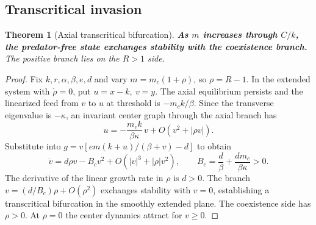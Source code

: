 \documentclass[12pt,a4paper,twoside,fleqn]{article}
\theoremstyle{journal}
\newtheorem{theorem}{Theorem}
\newcommand{\claim}[1]{{\normalfont\bfseries\boldmath #1}}
\begin{document}
\subsection{Transcritical invasion}
\begin{theorem}[Axial transcritical bifurcation]\label{thm:tc}
\claim{As \(m\) increases through \(C/k\), the predator-free state exchanges stability with the coexistence branch.} The positive branch lies on the \(R>1\) side.
\end{theorem}
\begin{proof}
Fix \(k,r,\alpha,\beta,e,d\) and vary \(m=m_c(1+\rho)\), so \(\rho=R-1\). In the extended system with \(\dot\rho=0\), put \(u=x-k,\ v=y\). The axial equilibrium persists and the linearized feed from \(v\) to \(u\) at threshold is \(-m_c k/\beta\). Since the transverse eigenvalue is \(-\kappa\), an invariant center graph through the axial branch has
\[
 u=-\frac{m_c k}{\beta\kappa}\,v+O(v^2+|\rho v|).
\]
Substitute into \(g=v[em(k+u)/(\beta+v)-d]\) to obtain
\[
 \dot v=d\rho v-
 B_c v^2+O(|v|^3+|\rho|v^2),\qquad
 B_c=\frac d\beta+\frac{d m_c}{\beta\kappa}>0.
\]
The derivative of the linear growth rate in \(\rho\) is \(d>0\). The branch \(v=(d/B_c)\rho+O(\rho^2)\) exchanges stability with \(v=0\), establishing a transcritical bifurcation in the smoothly extended plane. The coexistence side has \(\rho>0\). At \(\rho=0\) the center dynamics attract for \(v\ge0\).

\end{proof}
\end{document}
